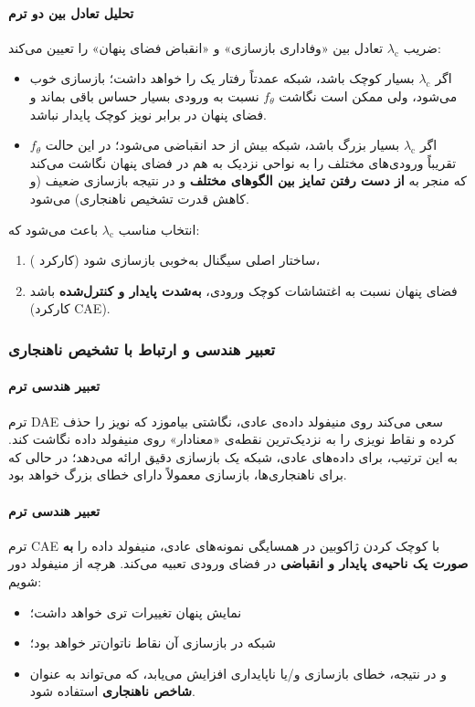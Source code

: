 \documentclass{article}
\begin{document}
\paragraph{تحلیل تعادل بین دو ترم}

ضریب \(\lambda_{\text{c}}\) تعادل بین «وفاداری بازسازی» و «انقباض فضای پنهان» را تعیین می‌کند:
\begin{itemize}
	\item اگر \(\lambda_{\text{c}}\) بسیار کوچک باشد، شبکه عمدتاً رفتار یک  را خواهد داشت؛ بازسازی خوب می‌شود، ولی ممکن است نگاشت \(f_\theta\) نسبت به ورودی بسیار حساس باقی بماند و فضای پنهان در برابر نویز کوچک پایدار نباشد.
	\item اگر \(\lambda_{\text{c}}\) بسیار بزرگ باشد، شبکه بیش از حد انقباضی می‌شود؛ در این حالت \(f_\theta\) تقریباً ورودی‌های مختلف را به نواحی نزدیک به هم در فضای پنهان نگاشت می‌کند که منجر به \textbf{از دست رفتن تمایز بین الگوهای مختلف} و در نتیجه بازسازی ضعیف (و کاهش قدرت تشخیص ناهنجاری) می‌شود.
\end{itemize}
انتخاب مناسب \(\lambda_{\text{c}}\) باعث می‌شود که:
\begin{enumerate}
	\item ساختار اصلی سیگنال به‌خوبی بازسازی شود (کارکرد )،
	\item فضای پنهان نسبت به اغتشاشات کوچک ورودی، \textbf{به‌شدت پایدار و کنترل‌شده} باشد (کارکرد CAE).
\end{enumerate}

\subsubsection{تعبیر هندسی و ارتباط با تشخیص ناهنجاری}

\paragraph{تعبیر هندسی ترم }
ترم DAE سعی می‌کند روی منیفولد داده‌ی عادی، نگاشتی بیاموزد که نویز را حذف کرده و نقاط نویزی را به نزدیک‌ترین نقطه‌ی «معنادار» روی منیفولد داده نگاشت کند. به این ترتیب، برای داده‌های عادی، شبکه یک بازسازی دقیق ارائه می‌دهد؛ در حالی که برای ناهنجاری‌ها، بازسازی معمولاً دارای خطای بزرگ خواهد بود.

\paragraph{تعبیر هندسی ترم }
ترم CAE با کوچک کردن ژاکوبین در همسایگی نمونه‌های عادی، منیفولد داده را \textbf{به صورت یک ناحیه‌ی پایدار و انقباضی} در فضای ورودی تعبیه می‌کند. هرچه از منیفولد دور شویم:
\begin{itemize}
	\item نمایش پنهان تغییرات ‌تری خواهد داشت؛
	\item شبکه در بازسازی آن نقاط ناتوان‌تر خواهد بود؛
	\item و در نتیجه، خطای بازسازی و/یا ناپایداری  افزایش می‌یابد، که می‌تواند به عنوان \textbf{شاخص ناهنجاری} استفاده شود.
\end{itemize}
\end{document}
